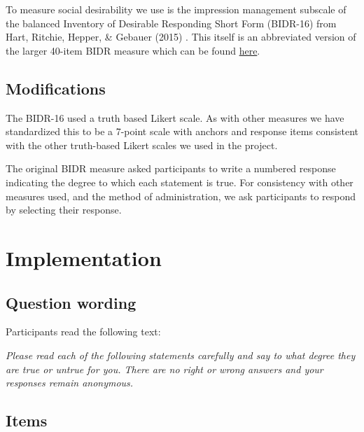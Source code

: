 \documentclass[
  letterpaper,
]{scrbook}
\begin{document}
To measure social desirability we use is the impression management
subscale of the balanced Inventory of Desirable Responding Short Form
(BIDR-16) from Hart, Ritchie, Hepper, \& Gebauer (2015) . This itself is
an abbreviated version of the larger 40-item BIDR measure which can be
found
\href{https://sjdm.org/dmidi/Balanced_Inventory_of_Desirable_Responding.html}{here}.

\subsection*{Modifications}\label{modifications-6}

The BIDR-16 used a truth based Likert scale. As with other measures we
have standardized this to be a 7-point scale with anchors and response
items consistent with the other truth-based Likert scales we used in the
project.

The original BIDR measure asked participants to write a numbered
response indicating the degree to which each statement is true. For
consistency with other measures used, and the method of administration,
we ask participants to respond by selecting their response.

\section{Implementation}\label{implementation-7}

\subsection*{Question wording}\label{question-wording-7}

Participants read the following text:

\emph{Please read each of the following statements carefully and say to
what degree they are true or untrue for you. There are no right or wrong
answers and your responses remain anonymous.}

\subsection*{Items}\label{items-7}
\end{document}
